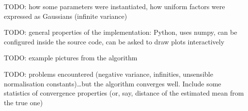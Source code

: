 \documentclass[11pt]{article}
\begin{document}
TODO: how some parameters were instantiated, how uniform factors were 
expressed as Gaussians (infinite variance)

TODO: general properties of the implementation: Python, uses numpy, can be 
configured inside the source code, can be asked to draw plots interactively

TODO: example pictures from the algorithm

TODO: problems encountered (negative variance, infinities, unsensible 
normalisation constants)\dots but the algorithm converges well. Include 
some statistics of convergence properties (or, say, distance of the 
estimated mean from the true one)



\end{document}
